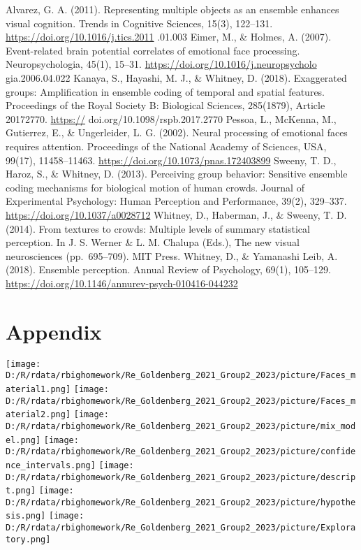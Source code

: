 \documentclass[
  man]{apa6}
\begin{document}
Alvarez, G. A. (2011). Representing multiple objects as an ensemble enhances visual cognition. Trends in Cognitive Sciences, 15(3), 122--131. \url{https://doi.org/10.1016/j.tics.2011} .01.003
Eimer, M., \& Holmes, A. (2007). Event-related brain potential correlates of emotional face processing. Neuropsychologia, 45(1), 15--31. \url{https://doi.org/10.1016/j.neuropsycholo} gia.2006.04.022
Kanaya, S., Hayashi, M. J., \& Whitney, D. (2018). Exaggerated groups: Amplification in ensemble coding of temporal and spatial features. Proceedings of the Royal Society B: Biological Sciences, 285(1879), Article 20172770. \url{https://} doi.org/10.1098/rspb.2017.2770
Pessoa, L., McKenna, M., Gutierrez, E., \& Ungerleider, L. G. (2002). Neural processing of emotional faces requires attention. Proceedings of the National Academy of Sciences, USA, 99(17), 11458--11463. \url{https://doi.org/10.1073/pnas.172403899}
Sweeny, T. D., Haroz, S., \& Whitney, D. (2013). Perceiving group behavior: Sensitive ensemble coding mechanisms for biological motion of human crowds. Journal of Experimental Psychology: Human Perception and Performance, 39(2), 329--337. \url{https://doi.org/10.1037/a0028712}
Whitney, D., Haberman, J., \& Sweeny, T. D. (2014). From textures to crowds: Multiple levels of summary statistical perception. In J. S. Werner \& L. M. Chalupa (Eds.), The new visual neurosciences (pp.~695--709). MIT Press.
Whitney, D., \& Yamanashi Leib, A. (2018). Ensemble perception. Annual Review of Psychology, 69(1), 105--129. \url{https://doi.org/10.1146/annurev-psych-010416-044232}

\newpage

\hypertarget{appendix}{%
\section{Appendix}\label{appendix}}

\texttt{[image: D:/R/rdata/rbighomework/Re\_Goldenberg\_2021\_Group2\_2023/picture/Faces\_material1.png]}
\texttt{[image: D:/R/rdata/rbighomework/Re\_Goldenberg\_2021\_Group2\_2023/picture/Faces\_material2.png]}
\texttt{[image: D:/R/rdata/rbighomework/Re\_Goldenberg\_2021\_Group2\_2023/picture/mix\_model.png]}
\texttt{[image: D:/R/rdata/rbighomework/Re\_Goldenberg\_2021\_Group2\_2023/picture/confidence\_intervals.png]}
\texttt{[image: D:/R/rdata/rbighomework/Re\_Goldenberg\_2021\_Group2\_2023/picture/descript.png]}
\texttt{[image: D:/R/rdata/rbighomework/Re\_Goldenberg\_2021\_Group2\_2023/picture/hypothesis.png]}
\texttt{[image: D:/R/rdata/rbighomework/Re\_Goldenberg\_2021\_Group2\_2023/picture/Exploratory.png]}
\end{document}
